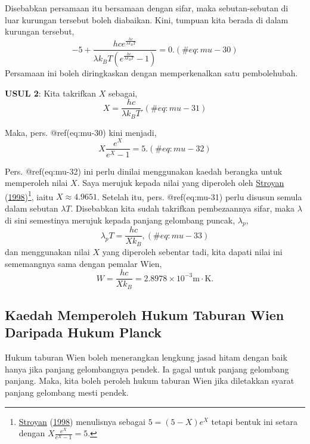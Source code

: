 \documentclass[
]{book}
\begin{document}
Disebabkan persamaan itu bersamaan dengan sifar, maka sebutan-sebutan di
luar kurungan tersebut boleh diabaikan. Kini, tumpuan kita berada di
dalam kurungan tersebut, \begin{equation}
-5+\frac{hce^{\frac{hc}{\lambda k_BT}}}{\lambda k_BT\left(e^{\frac{hc}{\lambda k_BT}}-1\right)}=0.
(\#eq:mu-30)
\end{equation} Persamaan ini boleh diringkaskan dengan memperkenalkan
satu pembolehubah.

\textbf{USUL 2}: Kita takrifkan \(X\) sebagai, \begin{equation}
X = \frac{hc}{\lambda k_BT}.
(\#eq:mu-31)
\end{equation}

Maka, pers. @ref(eq:mu-30) kini menjadi, \begin{equation}
X\frac{e^X}{e^X-1} = 5.
(\#eq:mu-32)
\end{equation}

Pers. @ref(eq:mu-32) ini perlu dinilai menggunakan kaedah berangka untuk
memperoleh nilai \(X\). Saya merujuk kepada nilai yang diperoleh oleh
\protect\hyperlink{ref-Stroyan1998}{Stroyan}
(\protect\hyperlink{ref-Stroyan1998}{1998})\footnote{\protect\hyperlink{ref-Stroyan1998}{Stroyan}
  (\protect\hyperlink{ref-Stroyan1998}{1998}) menulisnya sebagai
  \(5=(5-X)e^X\) tetapi bentuk ini setara dengan
  \(X\frac{e^X}{e^X-1} = 5\).}, iaitu \(X\approx 4.9651\). Setelah itu,
pers. @ref(eq:mu-31) perlu disusun semula dalam sebutan \(\lambda T\).
Disebabkan kita sudah takrifkan pembezaannya sifar, maka \(\lambda\) di
sini semestinya merujuk kepada panjang gelombang puncak, \(\lambda_p\),
\begin{equation}
\lambda_pT = \frac{hc}{X k_B},
(\#eq:mu-33)
\end{equation} dan menggunakan nilai \(X\) yang diperoleh sebentar tadi,
kita dapati nilai ini sememangnya sama dengan pemalar Wien,
\begin{equation}
W = \frac{hc}{X k_B} = 2.8978\times 10^{-3}\text{m}\cdot\text{K}.
\end{equation}

\hypertarget{sec:planck-taburan-wien}{%
\subsection{Kaedah Memperoleh Hukum Taburan Wien Daripada Hukum
Planck}\label{sec:planck-taburan-wien}}

Hukum taburan Wien boleh menerangkan lengkung jasad hitam dengan baik
hanya jika panjang gelombangnya pendek. Ia gagal untuk panjang gelombang
panjang. Maka, kita boleh peroleh hukum taburan Wien jika diletakkan
syarat panjang gelombang mesti pendek.
\end{document}
